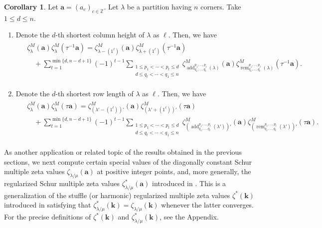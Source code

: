 \documentclass[12pt]{amsart}%
\theoremstyle{definition}
\newtheorem{cor}[theorem]{Corollary}
\DeclareMathOperator{\add}{add}
\DeclareMathOperator{\rem}{rem}
\newcommand{\ba}{\boldsymbol a}
\newcommand{\bk}{\boldsymbol k}
\begin{document}
\begin{cor}
\label{cor:9thPlucker}
Let $\ba=(a_c)_{c\in\mathbb{Z}}$.
Let $\lambda$ be a partition having $n$ corners.
Take $1\le d\le n$. 
\begin{enumerate}
\item  
Denote the $d$-th shortest column height of $\lambda$ as $\ell$.
Then, we have  
\begin{align}
\label{for:9thPluckerZeta}
\begin{split}
&\zeta^{M}_{\lambda}(\ba)\zeta^{M}_{\lambda}(\tau^{-1}\ba)
=\zeta^{M}_{\lambda-(1^{\ell})}(\ba)\zeta^{M}_{\lambda+(1^{\ell})}(\tau^{-1}\ba)\\
&\quad +\sum^{\min\{d,n-d+1\}}_{t=1}(-1)^{t-1}
\sum_{\substack{1\le p_1<\cdots<p_t\le d \\ d\le q_t<\cdots<q_1\le n}}
\zeta^{M}_{\add^{p_1,\ldots,p_t}_{q_1,\ldots,q_t}(\lambda)}(\ba)
\zeta^{M}_{\rem^{p_1,\ldots,p_t}_{q_1,\ldots,q_t}(\lambda)}(\tau^{-1}\ba).
\end{split}
\end{align}
\item 
Denote the $d$-th shortest row length of $\lambda$ as $\ell$.
Then, we have  
\begin{align}
\label{for:9thDualPluckerZeta}
\begin{split}
&\zeta^{M}_{\lambda}(\ba)\zeta^{M}_{\lambda}(\tau\ba)
=\zeta^{M}_{(\lambda'-(1^{\ell}))'}(\ba)\zeta^{M}_{(\lambda'+(1^{\ell}))'}(\tau\ba)\\
&\quad +\sum^{\min\{d,n-d+1\}}_{t=1}(-1)^{t-1}
\sum_{\substack{1\le p_1<\cdots<p_t\le d \\ d\le q_t<\cdots<q_1\le n}}
\zeta^{M}_{(\add^{p_1,\ldots,p_t}_{q_1,\ldots,q_t}(\lambda'))'}(\ba)
\zeta^{M}_{(\rem^{p_1,\ldots,p_t}_{q_1,\ldots,q_t}(\lambda'))'}(\tau\ba).
\end{split}
\end{align}
\end{enumerate}
\end{cor}

As another application or related topic of the results obtained in the previous sections, we next compute certain special values of the diagonally constant Schur multiple zeta values
$\zeta_{\lambda/\mu}(\ba)$ at positive integer points, and, more generally,
the regularized Schur multiple zeta values
$\zeta^{\ast}_{\lambda/\mu}(\ba)$ introduced in \cite{bc}.
This is a generalization of the stuffle (or harmonic) regularized multiple zeta values
$\zeta^{\ast}(\bk)$ introduced in \cite{ikz06}
satisfying that $\zeta^{\ast}_{\lambda/\mu}(\bk)=\zeta_{\lambda/\mu}(\bk)$
whenever the latter converges.
For the precise definitions of $\zeta^{\ast}(\bk)$ and 
$\zeta^{\ast}_{\lambda/\mu}(\bk)$, see the Appendix.
\end{document}
